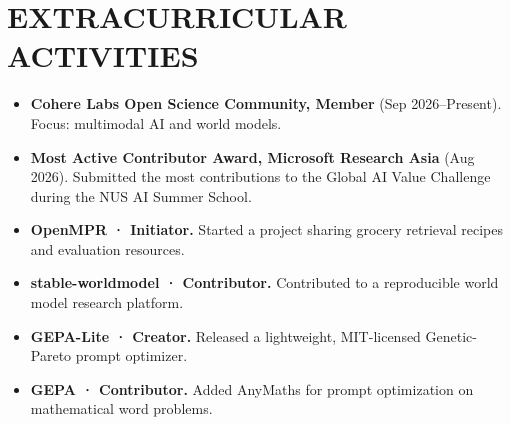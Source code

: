 \documentclass[11pt,a4paper]{article}
\begin{document}
\section{EXTRACURRICULAR ACTIVITIES}
\begin{itemize}
  \item \textbf{Cohere Labs Open Science Community, Member} (Sep 2026–Present). Focus: multimodal AI and world models.
  \item \textbf{Most Active Contributor Award, Microsoft Research Asia} (Aug 2026). Submitted the most contributions to the Global AI Value Challenge during the NUS AI Summer School.
  \item \textbf{OpenMPR · Initiator.} Started a project sharing grocery retrieval recipes and evaluation resources.
  \item \textbf{stable-worldmodel · Contributor.} Contributed to a reproducible world model research platform.
  \item \textbf{GEPA-Lite · Creator.} Released a lightweight, MIT-licensed Genetic-Pareto prompt optimizer.
  \item \textbf{GEPA · Contributor.} Added AnyMaths for prompt optimization on mathematical word problems.
\end{itemize}
\end{document}
